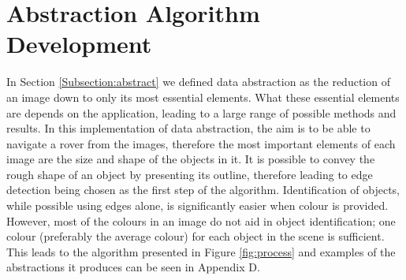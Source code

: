 \chapter{Abstraction Algorithm Development}
\label{chapter:abstract}

In Section \ref{Subsection:abstract} we defined data abstraction as the reduction of an image down to only its most essential elements. What these essential elements are depends on the application, leading to a large range of possible methods and results. In this implementation of data abstraction, the aim is to be able to navigate a rover from the images, therefore the most important elements of each image are the size and shape of the objects in it. It is possible to convey the rough shape of an object by presenting its outline, therefore leading to edge detection being chosen as the first step of the algorithm. Identification of objects, while possible using edges alone, is significantly easier when colour is provided. However, most of the colours in an image do not aid in object identification; one colour (preferably the average colour) for each object in the scene is sufficient. This leads to the algorithm presented in Figure \ref{fig:process} and examples of the abstractions it produces can be seen in Appendix D.


